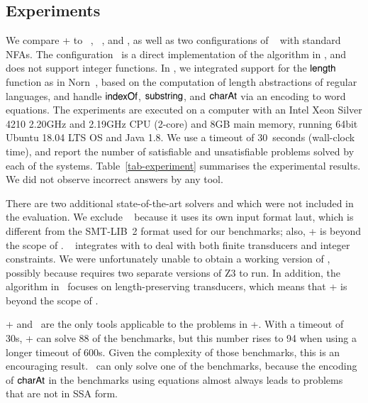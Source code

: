 \vspace{-3mm}
\subsection{Experiments}\label{sec:exp-res}

We compare {\ostrich}+ to {\cvc}~\cite{cvc4}, {\zthree}~\cite{Z3-str},
and {\zthreetrau} \cite{Z3-trau}, as well as two configurations of
\ostrich~\cite{CHL+19} with standard NFAs. The configuration \ostrichi\ is
a direct implementation of the algorithm in \cite{CHL+19}, and does
not support integer functions. In \ostrichii, we integrated support
for the $\mathsf{length}$ function as in Norn~\cite{Abdulla14}, based on the
computation of length abstractions of regular languages, and handle
$\mathsf{indexOf}$, $\mathsf{substring}$, and $\mathsf{charAt}$ via an encoding to word equations.
%
The experiments are executed on a computer with an Intel Xeon Silver 4210 2.20GHz and 2.19GHz CPU (2-core) and 8GB main memory, running 64bit Ubuntu 18.04 LTS OS and Java 1.8. We use a timeout of 30~seconds (wall-clock time), and report the number of satisfiable and unsatisfiable problems solved by each of the systems. Table~\ref{tab-experiment} summarises the experimental results. We did not observe incorrect answers by any tool.

There are two additional state-of-the-art solvers  {\slent} and {\trauplus} which were not included in
the evaluation. We exclude {\slent}~\cite{WC+18} because it uses its own input format laut, which is different from the SMT-LIB~2 format used for our
benchmarks; also, {\transducerbench+} is beyond the scope of {\slent}.
%
{\trauplus}~\cite{AbdullaA+19}  integrates {\trau} with {\sloth} to deal with both finite transducers and integer constraints. We were unfortunately unable
to obtain a working version of {\trauplus}, possibly because {\trau} requires two separate versions of Z3 to run. In addition, the algorithm in~\cite{AbdullaA+19} focuses on length-preserving transducers, which means that {\transducerbench}+ is beyond the scope of \trauplus.
 
{\ostrich}+ and \ostrich\ are the only tools applicable to the
problems in {\transducerbench}+. With a timeout of 30s, \ostrich+ can
solve 88 of the benchmarks, but this number rises to 94 when using a
longer timeout of 600s. Given the complexity of those benchmarks, this
is an encouraging result. \ostrich\ can only solve one of the
benchmarks, because the encoding of $\mathsf{charAt}$ in the benchmarks using
equations almost always leads to problems that are not in SSA form.

